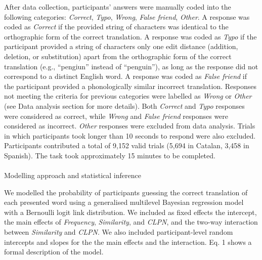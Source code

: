 \documentclass[
]{article}
\makeatletter
\let\oldparagraph\paragraph
\renewcommand{\paragraph}{
    \@ifstar
      \xxxParagraphStar
      \xxxParagraphNoStar
  }
\newcommand{\xxxParagraphStar}[1]{\oldparagraph*{#1}\mbox{}}
\newcommand{\xxxParagraphNoStar}[1]{\oldparagraph{#1}\mbox{}}
\makeatother
\begin{document}
After data collection, participants' answers were manually coded into
the following categories: \emph{Correct}, \emph{Typo}, \emph{Wrong},
\emph{False friend}, \emph{Other}. A response was coded as
\emph{Correct} if the provided string of characters was identical to the
orthographic form of the correct translation. A response was coded as
\emph{Typo} if the participant provided a string of characters only one
edit distance (addition, deletion, or substitution) apart from the
orthographic form of the correct translation (e.g., ``pengiun'' instead
of ``penguin''), as long as the response did not correspond to a
distinct English word. A response was coded as \emph{False friend} if
the participant provided a phonologically similar incorrect translation.
Responses not meeting the criteria for previous categories were labelled
as \emph{Wrong} or \emph{Other} (see Data analysis section for more
details). Both \emph{Correct} and \emph{Typo} responses were considered
as correct, while \emph{Wrong} and \emph{False friend} responses were
considered as incorrect. \emph{Other} responses were excluded from data
analysis. Trials in which participants took longer than 10 seconds to
respond were also excluded. Participants contributed a total of 9,152
valid trials (5,694 in Catalan, 3,458 in Spanish). The task took
approximately 15 minutes to be completed.

\paragraph{Modelling approach and statistical
inference}\label{modelling-approach-and-statistical-inference}

We modelled the probability of participants guessing the correct
translation of each presented word using a generalised multilevel
Bayesian regression model with a Bernoulli logit link distribution. We
included as fixed effects the intercept, the main effects of
\emph{Frequency}, \emph{Similarity}, and \emph{CLPN}, and the two-way
interaction between \emph{Similarity} and \emph{CLPN}. We also included
participant-level random intercepts and slopes for the the main effects
and the interaction. Eq. 1 shows a formal description of the model.
\end{document}
